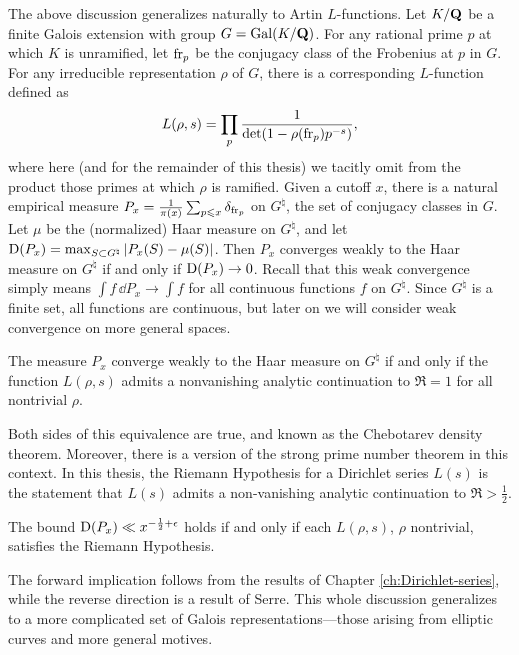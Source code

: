 The above discussion generalizes naturally to Artin $L$-functions. 
Let $K/\mathbf{Q}$ be a finite Galois extension with group $G=\operatorname{Gal}(K/\mathbf{Q})$. For any 
rational prime $p$ at which $K$ is unramified, let $\mathrm{fr}_p$ be the conjugacy 
class of the Frobenius at $p$ in $G$. For any irreducible representation 
$\rho$ of $G$, there is a corresponding $L$-function defined as 
\[
	L(\rho,s) = \prod_p \frac{1}{\det(1-\rho(\mathrm{fr}_p) p^{-s})} ,
\]
where here (and for the remainder of this thesis) we tacitly omit from the 
product those primes at which $\rho$ is ramified. Given a cutoff $x$, there is 
a natural empirical measure 
$P_x = \frac{1}{\pi(x)} \sum_{p\leqslant x} \delta_{\mathrm{fr}_p}$ on 
$G^\natural$, the set of conjugacy classes in $G$. Let $\mu$ be the 
(normalized) Haar measure on $G^\natural$, and let 
$\operatorname{D}(P_x) = \max_{S\subset G^\natural} \left| P_x(S) - \mu(S)\right|$. 
Then $P_x$ converges weakly to the Haar measure on $G^\natural$ if and 
only if $\operatorname{D}(P_x) \to 0$. Recall that this weak convergence simply means 
$\int f\, \dd P_x \to \int f$ for all continuous functions $f$ on $G^\natural$. 
Since $G^\natural$ is a finite set, all functions are continuous, but later 
on we will consider weak convergence on more general spaces.  

\begin{theorem}
The measure $P_x$ converge weakly to the Haar measure on $G^\natural$ if and 
only if the function $L(\rho,s)$ admits a nonvanishing analytic continuation 
to $\Re = 1$ for all nontrivial $\rho$. 
\end{theorem}

Both sides of this equivalence are true, and known as the Chebotarev density 
theorem. Moreover, there is a version of the strong prime number theorem in 
this context. In this thesis, the Riemann Hypothesis for a Dirichlet series 
$L(s)$ is the statement that $L(s)$ admits a non-vanishing analytic 
continuation to $\Re > \frac 1 2$. 

\begin{theorem}
The bound $\operatorname{D}(P_x) \ll x^{-\frac 1 2+\epsilon}$ holds if and only if each
$L(\rho,s)$, $\rho$ nontrivial, satisfies the Riemann Hypothesis. 
\end{theorem}

The forward implication follows from the results of Chapter 
\ref{ch:Dirichlet-series}, while the reverse direction is a result of Serre. 
This whole discussion generalizes to a more complicated set of Galois 
representations---those arising from elliptic curves and more general motives.  





